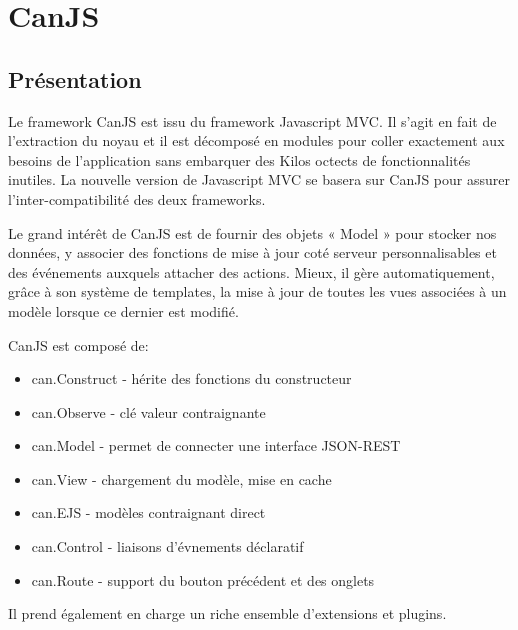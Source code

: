 \section{CanJS}
\label{ch:canjs}

\subsection{Présentation}

Le framework CanJS est issu du framework Javascript MVC. Il s'agit en fait de l'extraction du noyau et il est décomposé en modules pour coller exactement aux besoins de l’application sans embarquer des Kilos octects de fonctionnalités inutiles. La nouvelle version de Javascript MVC se basera sur CanJS pour assurer l’inter-compatibilité des deux frameworks.

Le grand intérêt de CanJS est de fournir des objets « Model » pour stocker nos données, y associer des fonctions de mise à jour coté serveur personnalisables et des événements auxquels attacher des actions. Mieux, il gère automatiquement, grâce à son système de templates, la mise à jour de toutes les vues associées à un modèle lorsque ce dernier est modifié.

CanJS est composé de:
\begin{itemize}

    \item[\textbullet]
	can.Construct - hérite des fonctions du constructeur
	
	\item[\textbullet]
	can.Observe - clé valeur contraignante

	\item[\textbullet]
    can.Model -  permet de connecter une interface JSON-REST
	
	\item[\textbullet]
    can.View - chargement du modèle, mise en cache

	\item[\textbullet]
    can.EJS - modèles contraignant direct

	\item[\textbullet]
    can.Control - liaisons d’évnements déclaratif
    
	\item[\textbullet]    
    can.Route - support du bouton précédent et des onglets
    	
\end{itemize}

Il prend également en charge un riche ensemble d’extensions et plugins.

